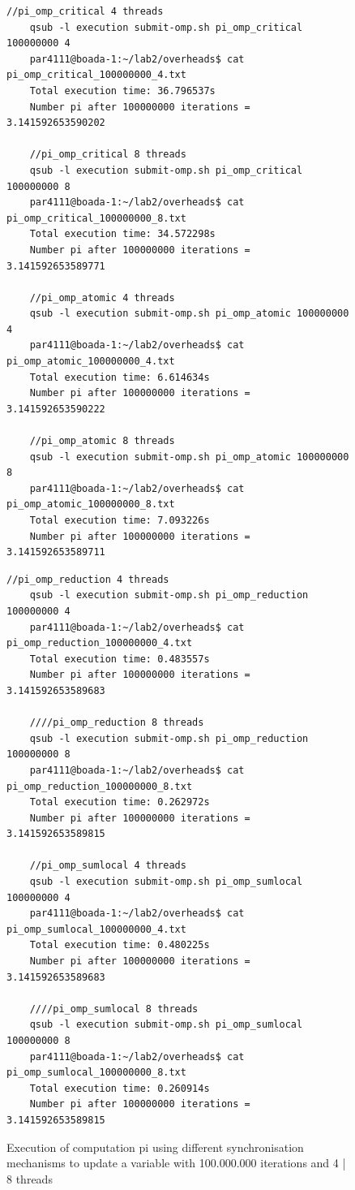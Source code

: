 \documentclass[12]{article}
\begin{document}
\begin{figure}[H]
\begin{lstlisting}[frame=single]
    //pi_omp_critical 4 threads
    qsub -l execution submit-omp.sh pi_omp_critical 100000000 4
    par4111@boada-1:~/lab2/overheads$ cat pi_omp_critical_100000000_4.txt 
    Total execution time: 36.796537s
    Number pi after 100000000 iterations = 3.141592653590202

    //pi_omp_critical 8 threads
    qsub -l execution submit-omp.sh pi_omp_critical 100000000 8
    par4111@boada-1:~/lab2/overheads$ cat pi_omp_critical_100000000_8.txt 
    Total execution time: 34.572298s
    Number pi after 100000000 iterations = 3.141592653589771

    //pi_omp_atomic 4 threads
    qsub -l execution submit-omp.sh pi_omp_atomic 100000000 4
    par4111@boada-1:~/lab2/overheads$ cat pi_omp_atomic_100000000_4.txt 
    Total execution time: 6.614634s
    Number pi after 100000000 iterations = 3.141592653590222

    //pi_omp_atomic 8 threads
    qsub -l execution submit-omp.sh pi_omp_atomic 100000000 8
    par4111@boada-1:~/lab2/overheads$ cat pi_omp_atomic_100000000_8.txt 
    Total execution time: 7.093226s
    Number pi after 100000000 iterations = 3.141592653589711
\end{lstlisting}
\end{figure}
\begin{figure}[H]
\begin{lstlisting}[frame=single]
    //pi_omp_reduction 4 threads
    qsub -l execution submit-omp.sh pi_omp_reduction 100000000 4
    par4111@boada-1:~/lab2/overheads$ cat pi_omp_reduction_100000000_4.txt 
    Total execution time: 0.483557s
    Number pi after 100000000 iterations = 3.141592653589683

    ////pi_omp_reduction 8 threads
    qsub -l execution submit-omp.sh pi_omp_reduction 100000000 8
    par4111@boada-1:~/lab2/overheads$ cat pi_omp_reduction_100000000_8.txt 
    Total execution time: 0.262972s
    Number pi after 100000000 iterations = 3.141592653589815

    //pi_omp_sumlocal 4 threads
    qsub -l execution submit-omp.sh pi_omp_sumlocal 100000000 4
    par4111@boada-1:~/lab2/overheads$ cat pi_omp_sumlocal_100000000_4.txt 
    Total execution time: 0.480225s
    Number pi after 100000000 iterations = 3.141592653589683

    ////pi_omp_sumlocal 8 threads
    qsub -l execution submit-omp.sh pi_omp_sumlocal 100000000 8
    par4111@boada-1:~/lab2/overheads$ cat pi_omp_sumlocal_100000000_8.txt 
    Total execution time: 0.260914s
    Number pi after 100000000 iterations = 3.141592653589815
\end{lstlisting}
\caption{Execution of computation pi using different synchronisation mechanisms to update a variable with 100.000.000 iterations and 4 | 8  threads}
\label{overheadsComputation}
\end{figure}
\end{document}
